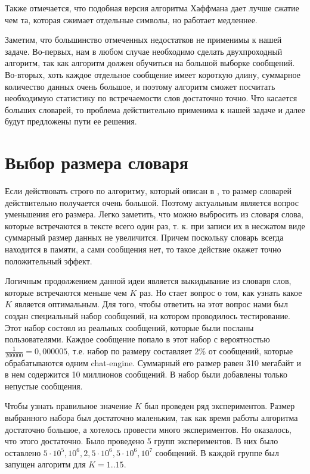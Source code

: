 Также отмечается, что подобная версия алгоритма Хаффмана дает лучше сжатие чем та, которая сжимает
 отдельные символы, но работает медленнее.

Заметим, что большинство отмеченных недостатков не применимы к нашей задаче. Во-первых, нам в любом 
случае необходимо сделать двухпроходный алгоритм, так как алгоритм должен обучиться на большой выборке
 сообщений. Во-вторых, хоть каждое отдельное сообщение имеет короткую длину, суммарное количество 
 данных очень большое, и поэтому алгоритм сможет посчитать необходимую статистику по встречаемости 
 слов достаточно точно. Что касается больших словарей, то проблема действительно применима к нашей
  задаче и далее будут предложены пути ее решения.

\section{Выбор размера словаря}

Если действовать строго по алгоритму, который описан в \cite{handbook}, то размер словарей действительно получается очень большой. 
Поэтому актуальным является вопрос уменьшения его размера. Легко заметить, что можно выбросить из словаря слова,
которые встречаются в тексте всего один раз, т. к. при записи их в несжатом виде суммарный размер данных не увеличится.
Причем поскольку словарь всегда находится в памяти, а сами сообщения нет, то такое действие окажет точно положительный эффект.

Логичным продолжением данной идеи является выкидывание из словаря слов, которые встречаются меньше чем $K$ раз. Но стает вопрос о том, 
как узнать какое $K$ является оптимальным. Для того, чтобы ответить на этот вопрос нами был создан специальный набор сообщений,
на котором проводилось тестирование. Этот набор состоял из реальных сообщений, которые были посланы пользователями. Каждое сообщение 
попало в этот набор с вероятностью $\frac{1}{200000}=0,000005$, т.е. набор по размеру составляет $2\%$ от сообщений, которые обрабатываются 
одним chat-engine. Суммарный его размер равен 310 мегабайт и в нем содержится 10 миллионов сообщений. В набор были добавлены только непустые
сообщения.

Чтобы узнать правильное значение $K$ был проведен ряд экспериментов. Размер выбранного набора был достаточно маленьким, так как 
время работы алгоритма достаточно большое, а хотелось провести много экспериментов. Но оказалось, что этого достаточно. 
Было проведено 5 групп экспериментов. В них было оставлено $5 \cdot 10^5, 10^6, 2,5 \cdot 10^6, 5 \cdot 10^6, 10^7$ сообщений. В каждой группе был запущен алгоритм
для $K = 1..15$.

